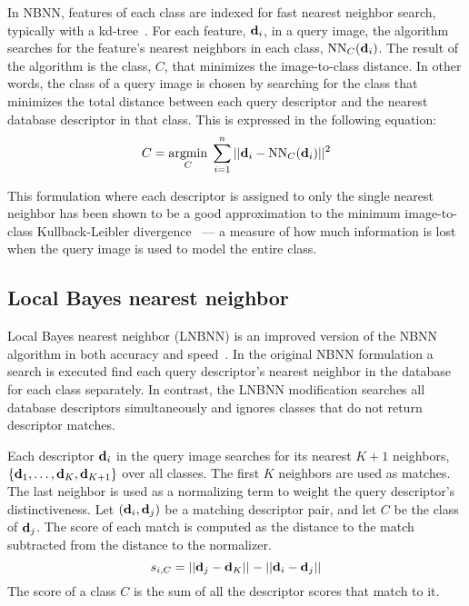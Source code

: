         In NBNN, features of each class are indexed for fast nearest neighbor search, typically with a
        kd-tree~\cite{bentley_multidimensional_1975}. For each feature, $\mathbf{d}_i$, in a query image, the algorithm
        searches for the feature's nearest neighbors in each class, $\operatorname{NN}_C(\mathbf{d}_i)$. The result of the
        algorithm is the class, $C$, that minimizes the image-to-class distance. In other words, the class of a
        query image is chosen by searching for the class that minimizes the total distance between each query
        descriptor and the nearest database descriptor in that class. This is expressed in the following equation:
        \begin{equation}
            C = \underset{C}{\operatorname{argmin}}\; \sum_{i=1}^n ||\mathbf{d}_i - \operatorname{NN}_C(\mathbf{d}_i)||^2
        \end{equation}

        This formulation where each descriptor is assigned to only the single nearest neighbor has been shown to be
        a good approximation to the minimum image-to-class Kullback-Leibler divergence~\cite{boiman_defense_2008}
        --- a measure of how much information is lost when the query image is used to model the entire class.

    \subsection{Local \naive{} Bayes nearest neighbor}\label{sec:lnbnn}  

        Local \naive{} Bayes nearest neighbor (LNBNN) is an improved version of the NBNN algorithm in both accuracy
        and speed~\cite{mccann_local_2012}. In the original NBNN formulation a search is executed find each query
        descriptor's nearest neighbor in the database for each class separately. In contrast, the LNBNN
        modification searches all database descriptors simultaneously and ignores classes that do not return
        descriptor matches.
        
        Each descriptor $\mathbf{d}_i$ in the query image searches for its nearest $K+1$ neighbors, %
        $\{\mathbf{d}_1, \ldots, \mathbf{d}_K, \mathbf{d}_{K + 1}\}$ over all classes.
        The first $K$ neighbors are used as matches.
        The last neighbor is used as a normalizing term to weight the query descriptor's distinctiveness.
        Let $(\mathbf{d}_i, \mathbf{d}_j)$ be a matching descriptor pair, and let $C$ be the class of $\mathbf{d}_j$.
        The score of each match is computed as the distance to the match subtracted from the distance to the
          normalizer.
        \begin{equation}
            s_{i, C} = ||\mathbf{d}_j - \mathbf{d}_K||_{} - ||\mathbf{d}_i - \mathbf{d}_j||_{}
        \end{equation}
        The score of a class $C$ is the sum of all the descriptor scores that match to it.

